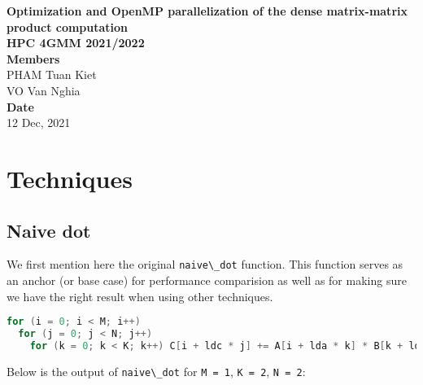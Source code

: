\documentclass[
  12pt,
  xcolor = usenames,dvipsnames]{article}
\author{}
\date{\vspace{-2.5em}}
\newcommand{\passthrough}[1]{#1}
\begin{document}
\onehalfspacing


\vspace*{\fill}
\begin{center}
  \LARGE{\textbf{Optimization and OpenMP parallelization of the dense matrix-matrix product computation}}\\
  \Large{\textbf{HPC 4GMM 2021/2022}}\\
  \vspace*{1\baselineskip}
  \Large{\textbf{Members}}\\
  PHAM Tuan Kiet\\
  VO Van Nghia\\
  \vfill %
  \vspace*{\fill}
  \Large{\textbf{Date}}\\
  12 Dec, 2021
\end{center}

\newpage

\newpage
{}
\tableofcontents
{}

\listoffigures

\newpage
{}

\hypertarget{techniques}{%
\section{Techniques}\label{techniques}}

\hypertarget{naive-dot}{%
\subsection{Naive dot}\label{naive-dot}}

We first mention here the original \passthrough{\lstinline!naive\_dot!} function. This function serves as an anchor (or base case) for performance comparision as well as for making sure we have the right result when using other techniques.

\begin{lstlisting}[language=C]
for (i = 0; i < M; i++)
  for (j = 0; j < N; j++)
    for (k = 0; k < K; k++) C[i + ldc * j] += A[i + lda * k] * B[k + ldb * j];
\end{lstlisting}

Below is the output of \passthrough{\lstinline!naive\_dot!} for \passthrough{\lstinline!M = 1!}, \passthrough{\lstinline!K = 2!}, \passthrough{\lstinline!N = 2!}:
\end{document}
